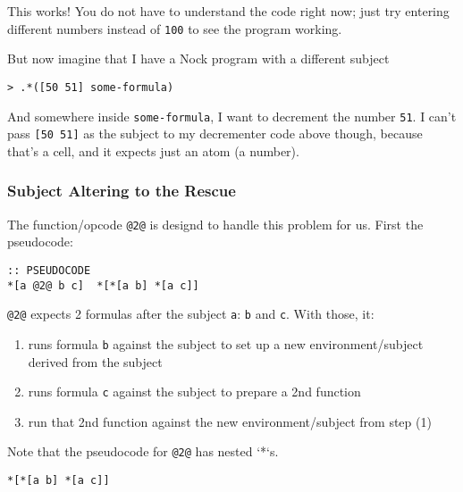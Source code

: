 \documentclass[twoside]{article}
\begin{document}
\noindent
This works! You do not have to understand the code right now; just try entering different numbers instead of \lstinline[style=inlinecode]{100} to see the program working.

But now imagine that I have a Nock program with a different subject

\begin{lstlisting}[style=listingcode]
> .*([50 51] some-formula)
\end{lstlisting}

And somewhere inside \lstinline[style=inlinecode]{some-formula}, I want to decrement the number \lstinline[style=inlinecode]{51}. I can't pass \lstinline[style=inlinecode]{[50 51]} as the subject to my decrementer code above though, because that's a cell, and it expects just an atom (a number).

\subsubsection{Subject Altering to the Rescue}

The function/opcode \lstinline[style=inlinecode]{@2@} is designd to handle this problem for us. First the pseudocode:

\begin{lstlisting}[style=listingcode]
:: PSEUDOCODE
*[a @2@ b c]  *[*[a b] *[a c]]
\end{lstlisting}

\lstinline[style=inlinecode]{@2@} expects 2 formulas after the subject \lstinline[style=inlinecode]{a}: \lstinline[style=inlinecode]{b} and \lstinline[style=inlinecode]{c}. With those, it:

\begin{enumerate}
  \item  runs formula \lstinline[style=inlinecode]{b} against the subject to set up a new environment/subject derived from the subject
  \item  runs formula \lstinline[style=inlinecode]{c} against the subject to prepare a 2nd function
  \item  run that 2nd function against the new environment/subject from step (1)
\end{enumerate}

Note that the pseudocode for \lstinline[style=inlinecode]{@2@} has nested `*`s.

\begin{lstlisting}[style=listingcode]
*[*[a b] *[a c]]
\end{lstlisting}
\end{document}
